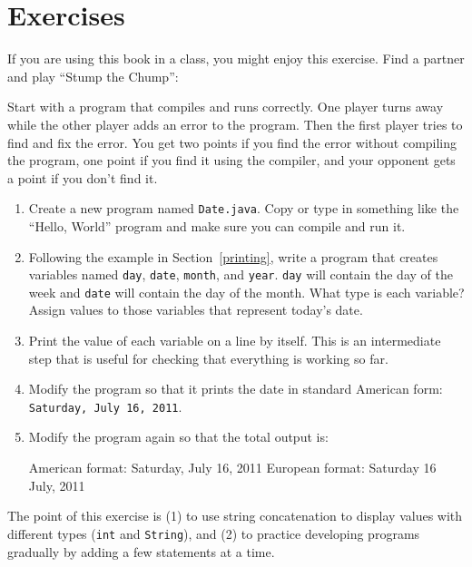 \section{Exercises}


\begin{exercise}

If you are using this book in a class, you might enjoy this exercise.
Find a partner and play ``Stump the Chump'':

Start with a program that compiles and runs correctly.
One player turns away while the other player adds an error to the program.
Then the first player tries to find and fix the error.
You get two points if you find the error without compiling the program, one point if you find it using the compiler, and your opponent gets a point if you don't find it.

\end{exercise}


\begin{exercise}
\label{ex.date}

\begin{enumerate}

\item Create a new program named {\tt Date.java}.
Copy or type in something like the ``Hello, World'' program and make sure you can compile and run it.

\item Following the example in Section~\ref{printing}, write a program that creates variables named {\tt day}, {\tt date}, {\tt month}, and {\tt year}.
{\tt day} will contain the day of the week and {\tt date} will contain the day of the month.
What type is each variable?
Assign values to those variables that represent today's date.

\item Print the value of each variable on a line by itself.
This is an intermediate step that is useful for checking that everything is working so far.

\item Modify the program so that it prints the date in standard American form: {\tt Saturday, July 16, 2011}.

\item Modify the program again so that the total output is:

\begin{stdout}
American format:
Saturday, July 16, 2011
European format:
Saturday 16 July, 2011
\end{stdout}

\end{enumerate}

The point of this exercise is (1) to use string concatenation to display values with different types ({\tt int} and {\tt String}), and (2) to practice developing programs gradually by adding a few statements at a time.

\end{exercise}


